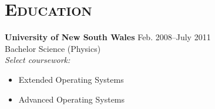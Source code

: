 


\section*{\textsc{Education}}
\vspace{-0.2cm}

\textbf{University of New South Wales}\tabto{7.0cm} {\small Feb. 2008--July 2011}\\
Bachelor Science (Physics)\\
\textit{Select coursework:}
\begin{itemize}
\item Extended Operating Systems
\item Advanced Operating Systems
\end{itemize}

